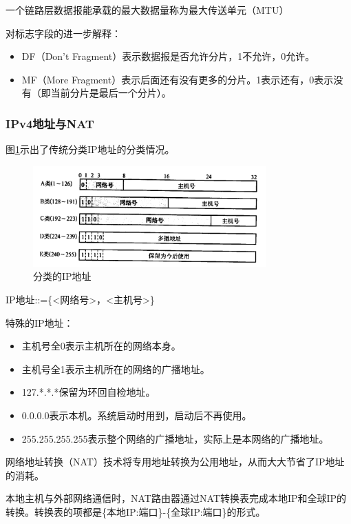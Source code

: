 \documentclass[12pt, a4paper, oneside]{ctexart}
\begin{document}
一个链路层数据报能承载的最大数据量称为最大传送单元（MTU）

对标志字段的进一步解释：
\begin{itemize}
    \item DF（Don't Fragment）表示数据报是否允许分片，1不允许，0允许。
    \item MF（More Fragment）表示后面还有没有更多的分片。1表示还有，0表示没有（即当前分片是最后一个分片）。
\end{itemize}

\subsubsection{IPv4地址与NAT}

图\ref{ip_classes}示出了传统分类IP地址的分类情况。

\begin{figure}[h]
    \centering
    \includegraphics[width=0.8\textwidth]{./images/ip_address.png}
    \caption{分类的IP地址}
    \label{ip_classes}
\end{figure}

IP地址::=\{<网络号>，<主机号>\}

特殊的IP地址：
\begin{itemize}
    \item 主机号全0表示主机所在的网络本身。
    \item 主机号全1表示主机所在的网络的广播地址。
    \item 127.*.*.*保留为环回自检地址。
    \item 0.0.0.0表示本机。系统启动时用到，启动后不再使用。
    \item 255.255.255.255表示整个网络的广播地址，实际上是本网络的广播地址。
\end{itemize}

网络地址转换（NAT）技术将专用地址转换为公用地址，从而大大节省了IP地址的消耗。

本地主机与外部网络通信时，NAT路由器通过NAT转换表完成本地IP和全球IP的转换。转换表的项都是\{本地IP:端口\}-\{全球IP:端口\}的形式。
\end{document}
